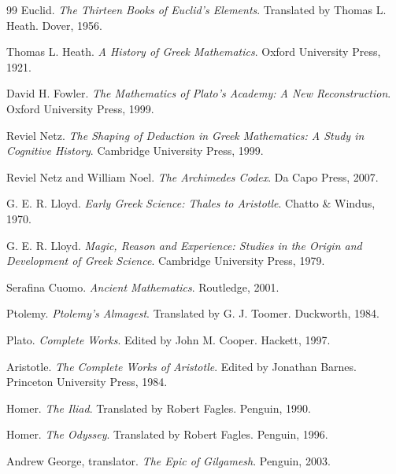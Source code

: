 \documentclass[11pt]{book}
\begin{document}
\begin{thebibliography}{99}
Euclid.
\newblock \emph{The Thirteen Books of Euclid's Elements}.
\newblock Translated by Thomas L. Heath. Dover, 1956.

Thomas L. Heath.
\newblock \emph{A History of Greek Mathematics}.
\newblock Oxford University Press, 1921.

David H. Fowler.
\newblock \emph{The Mathematics of Plato's Academy: A New Reconstruction}.
\newblock Oxford University Press, 1999.

Reviel Netz.
\newblock \emph{The Shaping of Deduction in Greek Mathematics: A Study in Cognitive History}.
\newblock Cambridge University Press, 1999.

Reviel Netz and William Noel.
\newblock \emph{The Archimedes Codex}.
\newblock Da Capo Press, 2007.

G. E. R. Lloyd.
\newblock \emph{Early Greek Science: Thales to Aristotle}.
\newblock Chatto \& Windus, 1970.

G. E. R. Lloyd.
\newblock \emph{Magic, Reason and Experience: Studies in the Origin and Development of Greek Science}.
\newblock Cambridge University Press, 1979.

Serafina Cuomo.
\newblock \emph{Ancient Mathematics}.
\newblock Routledge, 2001.

Ptolemy.
\newblock \emph{Ptolemy's Almagest}.
\newblock Translated by G. J. Toomer. Duckworth, 1984.

Plato.
\newblock \emph{Complete Works}.
\newblock Edited by John M. Cooper. Hackett, 1997.

Aristotle.
\newblock \emph{The Complete Works of Aristotle}.
\newblock Edited by Jonathan Barnes. Princeton University Press, 1984.

Homer.
\newblock \emph{The Iliad}.
\newblock Translated by Robert Fagles. Penguin, 1990.

Homer.
\newblock \emph{The Odyssey}.
\newblock Translated by Robert Fagles. Penguin, 1996.

Andrew George, translator.
\newblock \emph{The Epic of Gilgamesh}.
\newblock Penguin, 2003.


\end{thebibliography}
\end{document}
